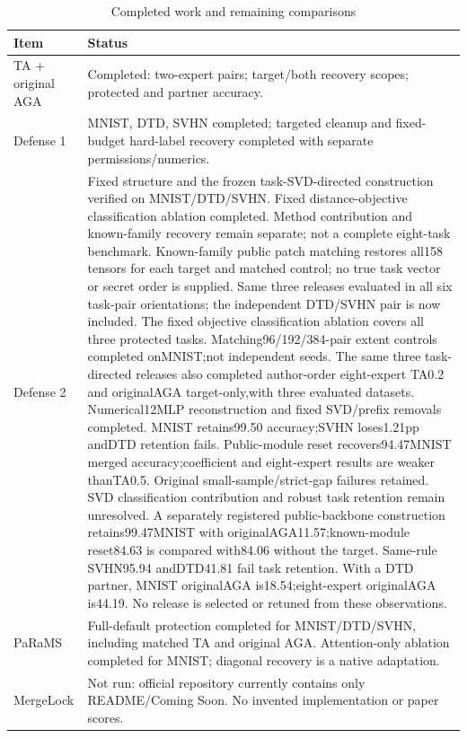 \begin{table}[!htbp]
\centering
\small
\caption{Completed work and remaining comparisons}
\label{tab:coverage}
\begin{tabular}{>{\raggedright\arraybackslash}p{37mm}>{\raggedright\arraybackslash}p{132mm}}
\toprule
Item & Status \\
\midrule
TA + original AGA & Completed: two-expert pairs; target/both recovery scopes; protected and partner accuracy. \\
Defense 1 & MNIST, DTD, SVHN completed; targeted cleanup and fixed-budget hard-label recovery completed with separate permissions/numerics. \\
Defense 2 & Fixed structure and the frozen task-SVD-directed construction verified on MNIST/DTD/SVHN. Fixed distance-objective classification ablation completed. Method contribution and known-family recovery remain separate; not a complete eight-task benchmark. Known-family public patch matching restores all158 tensors for each target and matched control; no true task vector or secret order is supplied. Same three releases evaluated in all six task-pair orientations; the independent DTD/SVHN pair is now included. The fixed objective classification ablation covers all three protected tasks. Matching96/192/384-pair extent controls completed onMNIST;not independent seeds. The same three task-directed releases also completed author-order eight-expert TA0.2 and originalAGA target-only,with three evaluated datasets. Numerical12MLP reconstruction and fixed SVD/prefix removals completed. MNIST retains99.50 accuracy;SVHN loses1.21pp andDTD retention fails. Public-module reset recovers94.47MNIST merged accuracy;coefficient and eight-expert results are weaker thanTA0.5. Original small-sample/strict-gap failures retained. SVD classification contribution and robust task retention remain unresolved. A separately registered public-backbone construction retains99.47MNIST with originalAGA11.57;known-module reset84.63 is compared with84.06 without the target. Same-rule SVHN95.94 andDTD41.81 fail task retention. With a DTD partner, MNIST originalAGA is18.54;eight-expert originalAGA is44.19. No release is selected or retuned from these observations. \\
PaRaMS & Full-default protection completed for MNIST/DTD/SVHN, including matched TA and original AGA. Attention-only ablation completed for MNIST; diagonal recovery is a native adaptation. \\
MergeLock & Not run: official repository currently contains only README/Coming Soon. No invented implementation or paper scores. \\

\end{tabular}
\end{table}
